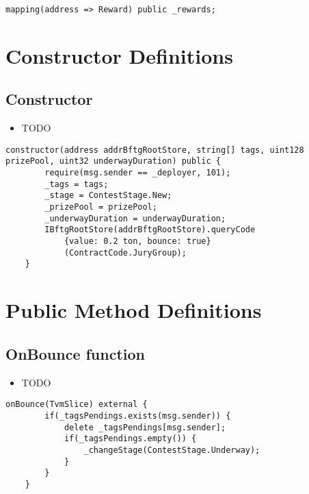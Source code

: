 \begin{lstlisting}[firstnumber=173]
    mapping(address => Reward) public _rewards;
\end{lstlisting}

\section{Constructor Definitions}


\subsection{Constructor}

\begin{itemize}
\item TODO
\end{itemize}

\begin{lstlisting}[firstnumber=34]
    constructor(address addrBftgRootStore, string[] tags, uint128 prizePool, uint32 underwayDuration) public {
        require(msg.sender == _deployer, 101);
        _tags = tags;
        _stage = ContestStage.New;
        _prizePool = prizePool;
        _underwayDuration = underwayDuration;
        IBftgRootStore(addrBftgRootStore).queryCode
            {value: 0.2 ton, bounce: true}
            (ContractCode.JuryGroup);
    }
\end{lstlisting}

\section{Public Method Definitions}


\subsection{OnBounce function}

\begin{itemize}
\item TODO
\end{itemize}

\begin{lstlisting}[firstnumber=64]
    onBounce(TvmSlice) external {
        if(_tagsPendings.exists(msg.sender)) {
            delete _tagsPendings[msg.sender];
            if(_tagsPendings.empty()) {
                _changeStage(ContestStage.Underway);
            }
        }
    }
\end{lstlisting}

